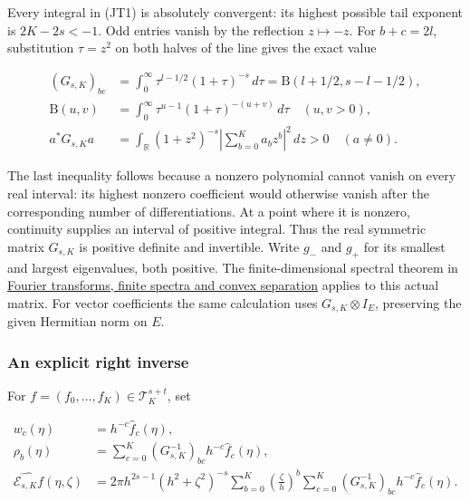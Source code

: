 \documentclass[
  11pt,
]{article}
\begin{document}
Every integral in (JT1) is absolutely convergent: its highest possible
tail exponent is \(2K-2s<-1\). Odd entries vanish by the reflection
\(z\mapsto-z\). For \(b+c=2l\), substitution \(\tau=z^2\) on both halves
of the line gives the exact value

\[
 \begin{aligned}
 (G_{s,K})_{bc}
 &=\int_0^\infty\tau^{l-1/2}(1+\tau)^{-s}\,d\tau
   =\mathrm B(l+1/2,s-l-1/2),\\
 \mathrm B(u,v)&=\int_0^\infty
          \tau^{u-1}(1+\tau)^{-(u+v)}\,d\tau
       \quad(u,v>0),\\
 a^*G_{s,K}a
 &=\int_{\mathbb R}(1+z^2)^{-s}
            \left|\sum_{b=0}^K a_bz^b\right|^2\,dz>0
                  \quad(a\ne0).
 \end{aligned}
 \tag{JT2}
\]

The last inequality follows because a nonzero polynomial cannot vanish
on every real interval: its highest nonzero coefficient would otherwise
vanish after the corresponding number of differentiations. At a point
where it is nonzero, continuity supplies an interval of positive
integral. Thus the real symmetric matrix \(G_{s,K}\) is positive
definite and invertible. Write \(g_-\) and \(g_+\) for its smallest and
largest eigenvalues, both positive. The finite-dimensional spectral
theorem in
\href{prerequisite-bridges.pdf}{Fourier
transforms, finite spectra and convex separation} applies to this actual
matrix. For vector coefficients the same calculation uses
\(G_{s,K}\otimes I_E\), preserving the given Hermitian norm on \(E\).

\subsubsection{An explicit right
inverse}\label{an-explicit-right-inverse}

For \(f=(f_0,\ldots,f_K)\in\mathcal T_K^{s+t}\), set

\[
 \begin{aligned}
 w_c(\eta)&=h^{-c}\widehat f_c(\eta),\\
 \rho_b(\eta)&=\sum_{c=0}^K(G_{s,K}^{-1})_{bc}
                         h^{-c}\widehat f_c(\eta),\\
 \widehat{\mathcal E_{s,K}f}(\eta,\zeta)
 &=2\pi h^{2s-1}(h^2+\zeta^2)^{-s}
       \sum_{b=0}^K\left(\frac\zeta h\right)^b
       \sum_{c=0}^K(G_{s,K}^{-1})_{bc}
                          h^{-c}\widehat f_c(\eta).
 \end{aligned}
 \tag{JT3}
\]
\end{document}
